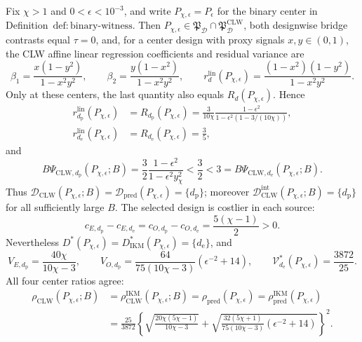 Fix \(\chi>1\) and \(0<\epsilon<10^{-3}\), and write \(P_{\chi,\epsilon}=P_\epsilon\) for the binary center in Definition~\(\mathrm{def{:}binary\text{-}witness}\).  Then \(P_{\chi,\epsilon}\in\mathfrak P_{\mathcal D}\cap\mathfrak P_{\mathcal D}^{\mathrm{CLW}}\), both designwise bridge contrasts equal \(\tau=0\), and, for a center design with proxy signals \(x,y\in(0,1)\), the CLW affine linear regression coefficients and residual variance are
\[
 \beta_1=\frac{x(1-y^2)}{1-x^2y^2},
 \qquad
 \beta_2=\frac{y(1-x^2)}{1-x^2y^2},
 \qquad
 r_d^{\mathrm{lin}}(P_{\chi,\epsilon})
 =\frac{(1-x^2)(1-y^2)}{1-x^2y^2}.                        \tag{1}
\]
Only at these centers, the last quantity also equals \(R_d(P_{\chi,\epsilon})\).  Hence
\[
 \begin{aligned}
 r_{d_{\mathrm p}}^{\mathrm{lin}}(P_{\chi,\epsilon})
 &=R_{d_{\mathrm p}}(P_{\chi,\epsilon})
 =\frac{3}{10\chi}
 \frac{1-\epsilon^2}{1-\epsilon^2(1-3/(10\chi))},\\
 r_{d_{\mathrm e}}^{\mathrm{lin}}(P_{\chi,\epsilon})
 &=R_{d_{\mathrm e}}(P_{\chi,\epsilon})=\frac35,
 \end{aligned}                                             \tag{2}
\]
and
\[
 B\Psi_{\mathrm{CLW},d_{\mathrm p}}(P_{\chi,\epsilon};B)
 =\frac32\frac{1-\epsilon^2}{1-\epsilon^2y_\chi^2}
 <\frac32<3
 =B\Psi_{\mathrm{CLW},d_{\mathrm e}}(P_{\chi,\epsilon};B). \tag{3}
\]
Thus \(\mathcal D_{\mathrm{CLW}}(P_{\chi,\epsilon};B)=\mathcal D_{\mathrm{pred}}(P_{\chi,\epsilon})=\{d_{\mathrm p}\}\); moreover \(\mathcal D_{\mathrm{CLW}}^{\mathrm{int}}(P_{\chi,\epsilon};B)=\{d_{\mathrm p}\}\) for all sufficiently large \(B\).  The selected design is costlier in each source:
\[
 c_{E,d_{\mathrm p}}-c_{E,d_{\mathrm e}}
 =c_{O,d_{\mathrm p}}-c_{O,d_{\mathrm e}}
 =\frac{5(\chi-1)}2>0.                                    \tag{4}
\]
Nevertheless \(D^*(P_{\chi,\epsilon})=D_{\mathrm{IKM}}^*(P_{\chi,\epsilon})=\{d_{\mathrm e}\}\), and
\[
 V_{E,d_{\mathrm p}}=\frac{40\chi}{10\chi-3},
 \qquad
 V_{O,d_{\mathrm p}}
 =\frac{64}{75(10\chi-3)}\left(\epsilon^{-2}+14\right),
 \qquad
 \mathcal V_{d_{\mathrm e}}^*(P_{\chi,\epsilon})=\frac{3872}{25}. \tag{5}
\]
All four center ratios agree:
\[
\begin{aligned}
 \rho_{\mathrm{CLW}}(P_{\chi,\epsilon};B)
 &=\rho_{\mathrm{CLW}}^{\mathrm{IKM}}(P_{\chi,\epsilon};B)
 =\rho_{\mathrm{pred}}(P_{\chi,\epsilon})
 =\rho_{\mathrm{pred}}^{\mathrm{IKM}}(P_{\chi,\epsilon})\\
 &=\frac{25}{3872}
 \left\{
 \sqrt{\frac{20\chi(5\chi-1)}{10\chi-3}}
 +\sqrt{\frac{32(5\chi+1)}{75(10\chi-3)}
 \left(\epsilon^{-2}+14\right)}
 \right\}^{2}.                                             \tag{6}
\end{aligned}
\]
